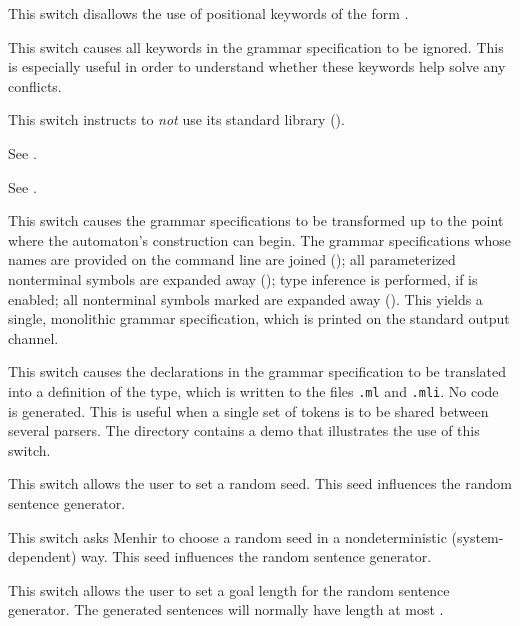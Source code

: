 \documentclass[onecolumn,11pt,nocopyrightspace,preprint]{sigplanconf}
\begin{document}
\docswitch{\onodollars} This switch disallows the use of positional keywords
of the form .

\docswitch{\onoinline} This switch causes all \dinline keywords in the
grammar specification to be ignored. This is especially useful in order
to understand whether these keywords help solve any conflicts.

\docswitch{\onostdlib} This switch instructs \menhir to \emph{not} use
its standard library ().

 See .

 See .

\docswitch{\oonlypreprocess} This switch causes the grammar specifications
to be transformed up to the point where the automaton's construction can
begin. The grammar specifications whose names are provided on the command line
are joined (); all parameterized nonterminal symbols are
expanded away (); type inference is performed, if \oinfer
is enabled; all nonterminal symbols marked \dinline are expanded away
(). This yields a single, monolithic grammar specification,
which is printed on the standard output channel.

\docswitch{\oonlytokens} This switch causes the \dtoken declarations in
the grammar specification to be translated into a definition of the \token
type, which is written to the files \texttt{.ml} and
\texttt{.mli}. No code is generated. This is useful when
a single set of tokens is to be shared between several parsers. The directory
 contains a demo that illustrates the use of this switch.

 This switch allows the user to set
a random seed. This seed influences the random sentence generator.

\docswitch{\orandomselfinit} This switch asks Menhir to choose a random seed
in a nondeterministic (system-dependent) way. This seed influences the random
sentence generator.

 This switch allows the user to
set a goal length for the random sentence generator. The generated sentences
will normally have length at most .
\end{document}
